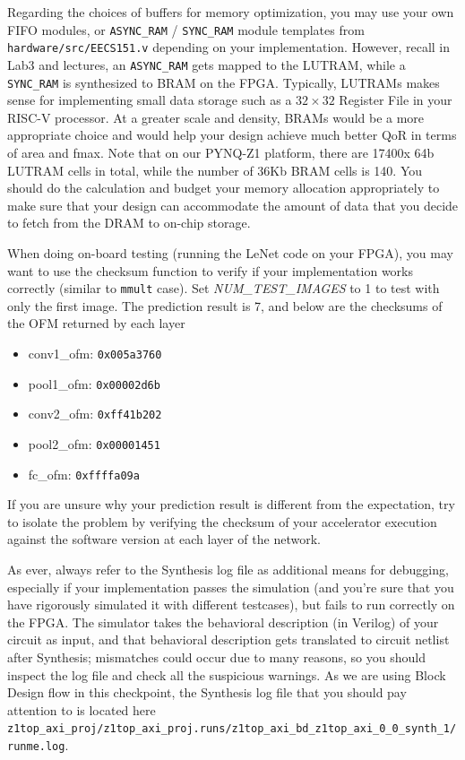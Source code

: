 \documentclass[11pt]{article}
\begin{document}
Regarding the choices of buffers for memory optimization, you may use your own FIFO modules, or \verb|ASYNC_RAM| / \verb|SYNC_RAM| module templates from \verb|hardware/src/EECS151.v| depending on your implementation. However, recall in Lab3 and lectures, an \verb|ASYNC_RAM| gets mapped to the LUTRAM, while a \verb|SYNC_RAM| is synthesized to BRAM on the FPGA. Typically, LUTRAMs makes sense for implementing small data storage such as a $32\times32$ Register File in your RISC-V processor. At a greater scale and density, BRAMs would be a more appropriate choice and would help your design achieve much better QoR in terms of area and fmax. Note that on our PYNQ-Z1 platform, there are 17400x 64b LUTRAM cells in total, while the number of 36Kb BRAM cells is 140. You should do the calculation and budget your memory allocation appropriately to make sure that your design can accommodate the amount of data that you decide to fetch from the DRAM to on-chip storage.

When doing on-board testing (running the LeNet code on your FPGA), you may want to use the checksum function to verify if your implementation works correctly (similar to \texttt{mmult} case). Set \textit{NUM\_TEST\_IMAGES} to 1 to test with only the first image. The prediction result is 7, and below are the checksums of the OFM returned by each layer

\begin{itemize}
\item conv1\_ofm: \verb|0x005a3760|
\item pool1\_ofm: \verb|0x00002d6b|
\item conv2\_ofm: \verb|0xff41b202|
\item pool2\_ofm: \verb|0x00001451|
\item fc\_ofm: \verb|0xffffa09a|
\end{itemize}

If you are unsure why your prediction result is different from the expectation, try to isolate the problem by verifying the checksum of your accelerator execution against the software version at each layer of the network.

As ever, always refer to the Synthesis log file as additional means for debugging, especially if your implementation passes the simulation (and you're sure that you have rigorously simulated it with different testcases), but fails to run correctly on the FPGA. The simulator takes the behavioral description (in Verilog) of your circuit as input, and that behavioral description gets translated to circuit netlist after Synthesis; mismatches could occur due to many reasons, so you should inspect the log file and check all the suspicious warnings. As we are using Block Design flow in this checkpoint, the Synthesis log file that you should pay attention to is located here \verb|z1top_axi_proj/z1top_axi_proj.runs/z1top_axi_bd_z1top_axi_0_0_synth_1/runme.log|.
\end{document}
